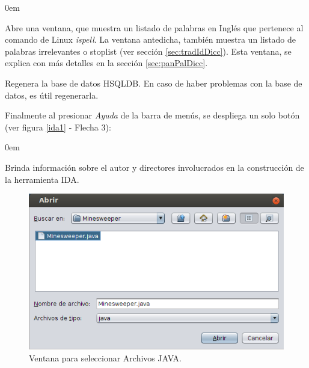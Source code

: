 \begin{description}
\itemsep0em%

\item[Ver Diccionarios:] Abre una ventana, que muestra un listado de palabras en Inglés que pertenece al comando de Linux \textit{ispell}. %
La ventana antedicha, también muestra un listado de palabras irrelevantes o stoplist (ver sección \ref{sec:tradIdDicc}). Esta ventana, se explica con más detalles en la sección \ref{sec:panPalDicc}.

\item[Restablecer B.D.(Base de Datos):] Regenera la base de datos HSQLDB. En caso de haber problemas con la base de datos, es útil regenerarla.

\end{description}

Finalmente al presionar \textit{Ayuda} de la barra de menús, se despliega un solo botón (ver figura \ref{ida1} - Flecha 3):

\begin{description}
\itemsep0em%
\item[Acerca de:] Brinda información sobre el autor y directores involucrados en la construcción de la herramienta IDA.
\end{description}

\begin{figure}[t] %
\centerline{%
\includegraphics[scale= 0.7]{./cap4/ida_02.png}
}
\caption{Ventana para seleccionar Archivos JAVA.}
\label{ida2}
\end{figure}

